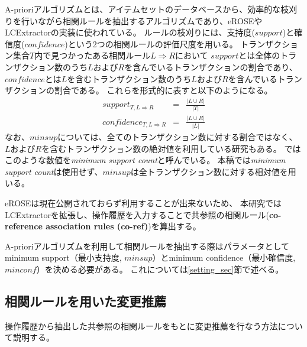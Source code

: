 \documentclass[a4paper]{jsbook}
\def\Ra{\Rightarrow}
\newcommand{\minconf}{mincon\!f}
\newcommand{\confidence}{con\!f\!idence}
\begin{document}
A-prioriアルゴリズム\cite{Bondugula:2006}とは、アイテムセットのデータベースから、効率的な枝刈りを行いながら相関ルールを抽出するアルゴリズムであり、eROSEやLCExtractorの実装に使われている。
ルールの枝刈りには、支持度($support$)と確信度($\confidence$)という2つの相関ルールの評価尺度を用いる。
トランザクション集合$T$内で見つかったある相関ルール$L \Ra R$において
$support$とは全体のトランザクション数のうち$L$および$R$を含んでいるトランザクションの割合であり、
$\confidence$とは$L$を含むトランザクション数のうち$L$および$R$を含んでいるトランザクションの割合である。
これらを形式的に表すと以下のようになる。
\begin{eqnarray}
  support_{T,L \Ra R} &=& \frac{| L \cup R |}{|T|} \label{support_eqn}\\
  \confidence_{T,L \Ra R} &=& \frac{| L \cup R |}{|L|}\label{confidence_eqn}
\end{eqnarray}
なお、$minsup$については、全てのトランザクション数に対する割合ではなく、$L$および$R$を含むトランザクション数の絶対値を利用している研究もある。
\cite{Zimmermann:2005}ではこのような数値を{\it minimum support count}と呼んでいる。
本稿では{\it minimum support count}は使用せず、$minsup$は全トランザクション数に対する相対値を用いる。

eROSEは現在公開されておらず利用することが出来ないため、
本研究ではLCExtractorを拡張し、操作履歴を入力することで共参照の相関ルール({\bf co-reference association rules (co-ref)})を算出する。

A-prioriアルゴリズムを利用して相関ルールを抽出する際はパラメータとしてminimum support（最小支持度, $minsup$）とminimum confidence（最小確信度, $\minconf$）を決める必要がある。
これについては\ref{setting_sec}節で述べる。


\subsection{相関ルールを用いた変更推薦}\label{ranking_sec}
操作履歴から抽出した共参照の相関ルールをもとに変更推薦を行なう方法について説明する。
\end{document}
